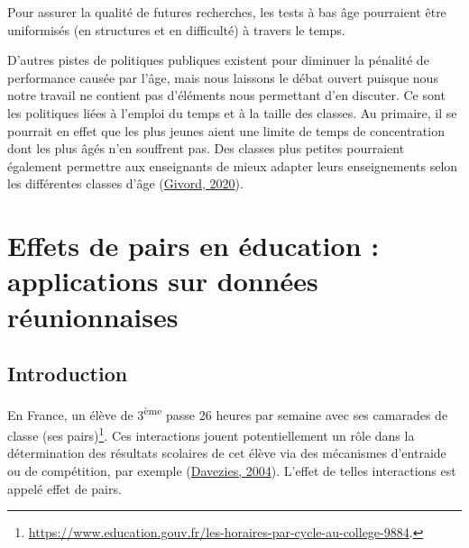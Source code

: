 \documentclass[
]{book}
\begin{document}
\quad Pour assurer la qualité de futures recherches, les tests à bas âge pourraient être uniformisés (en structures et en difficulté) à travers le temps.

\quad D'autres pistes de politiques publiques existent pour diminuer la pénalité de performance causée par l'âge, mais nous laissons le débat ouvert puisque nous notre travail ne contient pas d'éléments nous permettant d'en discuter. Ce sont les politiques liées à l'emploi du temps et à la taille des classes. Au primaire, il se pourrait en effet que les plus jeunes aient une limite de temps de concentration dont les plus âgés n'en souffrent pas. Des classes plus petites pourraient également permettre aux enseignants de mieux adapter leurs enseignements selon les différentes classes d'âge (\protect\hyperlink{ref-GIV:20}{Givord, 2020}).

\hypertarget{pe}{%
\chapter{Effets de pairs en éducation : applications sur données réunionnaises}\label{pe}}


\newpage

\hypertarget{peintro}{%
\section{Introduction}\label{peintro}}

En France, un élève de 3\textsuperscript{ème} passe 26 heures par semaine avec ses camarades de classe (ses pairs)\footnote{\url{https://www.education.gouv.fr/les-horaires-par-cycle-au-college-9884}.}. Ces interactions jouent potentiellement un rôle dans la détermination des résultats scolaires de cet élève via des mécanismes d'entraide ou de compétition, par exemple (\protect\hyperlink{ref-DAV:04}{Davezies, 2004}). L'effet de telles interactions est appelé effet de pairs.
\end{document}
